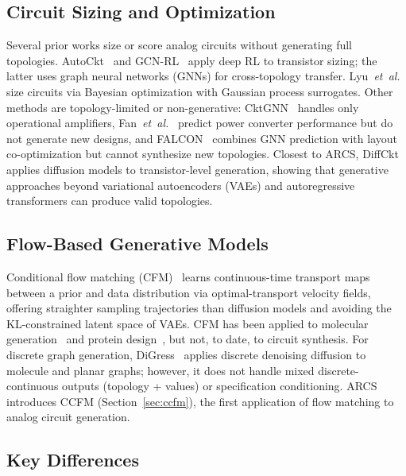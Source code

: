 \documentclass[conference]{IEEEtran}
\begin{document}
\subsection{Circuit Sizing and Optimization}

Several prior works size or score analog circuits without generating
full topologies. AutoCkt~\cite{autockt} and
GCN-RL~\cite{wang2020gcnrl} apply deep RL to transistor sizing; the
latter uses graph neural networks (GNNs) for cross-topology transfer.
Lyu~\emph{et~al.}~\cite{lyu2018weibo} size circuits via Bayesian
optimization with Gaussian process surrogates. Other methods are
topology-limited or non-generative: CktGNN~\cite{cktgnn} handles only
operational amplifiers, Fan~\emph{et~al.}~\cite{fan2024graph} predict
power converter performance but do not generate new designs, and
FALCON~\cite{falcon} combines GNN prediction with layout
co-optimization but cannot synthesize new topologies. Closest to
ARCS, DiffCkt~\cite{diffckt} applies diffusion models to
transistor-level generation, showing that generative approaches
beyond variational autoencoders (VAEs) and autoregressive transformers
can produce valid topologies.

\subsection{Flow-Based Generative Models}

Conditional flow matching (CFM)~\cite{lipman2023flow} learns
continuous-time transport maps between a prior and data distribution
via optimal-transport velocity fields, offering straighter sampling
trajectories than diffusion models and avoiding the KL-constrained
latent space of VAEs. CFM has been applied to molecular
generation~\cite{song2024equivariant} and protein design~\cite{jing2023eigenfold},
but not, to date, to circuit synthesis.
For discrete graph generation, DiGress~\cite{vignac2023digress} applies
discrete denoising diffusion to molecule and planar graphs; however, it
does not handle mixed discrete-continuous outputs (topology + values)
or specification conditioning.
ARCS introduces CCFM (Section~\ref{sec:ccfm}), the first application
of flow matching to analog circuit generation.

\subsection{Key Differences}
\end{document}
